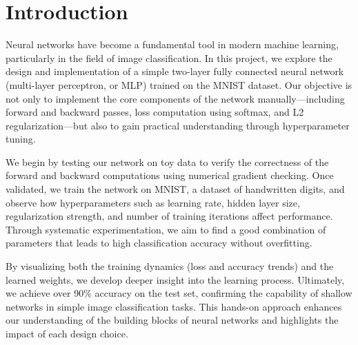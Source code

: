 \section{Introduction}
\label{sec:intro}

Neural networks have become a fundamental tool in modern machine learning, particularly in the field of image classification. In this project, we explore the design and implementation of a simple two-layer fully connected neural network (multi-layer perceptron, or MLP) trained on the MNIST dataset. Our objective is not only to implement the core components of the network manually—including forward and backward passes, loss computation using softmax, and L2 regularization—but also to gain practical understanding through hyperparameter tuning.

We begin by testing our network on toy data to verify the correctness of the forward and backward computations using numerical gradient checking. Once validated, we train the network on MNIST, a dataset of handwritten digits, and observe how hyperparameters such as learning rate, hidden layer size, regularization strength, and number of training iterations affect performance. Through systematic experimentation, we aim to find a good combination of parameters that leads to high classification accuracy without overfitting.

By visualizing both the training dynamics (loss and accuracy trends) and the learned weights, we develop deeper insight into the learning process. Ultimately, we achieve over 90\% accuracy on the test set, confirming the capability of shallow networks in simple image classification tasks. This hands-on approach enhances our understanding of the building blocks of neural networks and highlights the impact of each design choice.


